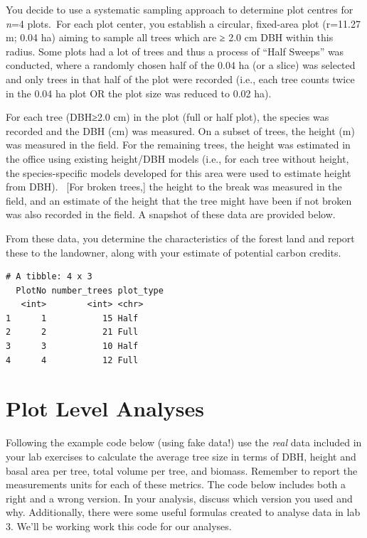 \documentclass[
  letterpaper,
]{book}
\begin{document}

You decide to use a systematic sampling approach to determine plot
centres for \emph{n}=4 plots.~For each plot center, you establish a
circular, fixed-area plot (r=11.27 m; 0.04 ha) aiming to sample all
trees which are ≥ 2.0 cm DBH within this radius. Some plots had a lot of
trees and thus a process of ``Half Sweeps'' was conducted, where a
randomly chosen half of the 0.04 ha (or a slice) was selected and only
trees in that half of the plot were recorded (i.e., each tree counts
twice in the 0.04 ha plot OR the plot size was reduced to 0.02 ha).

For each tree (DBH≥2.0 cm) in the plot (full or half plot), the species
was recorded and the DBH (cm) was measured. On a subset of trees, the
height (m) was measured in the field. For the remaining trees, the
height was estimated in the office using existing height/DBH models
(i.e., for each tree without height, the species-specific models
developed for this area were used to estimate height from DBH). ~{[}For
broken trees,{]} the height to the break was measured in the field, and
an estimate of the height that the tree might have been if not broken
was also recorded in the field. A snapshot of these data are provided
below.

From these data, you determine the characteristics of the forest land
and report these to the landowner, along with your estimate of potential
carbon credits.

\begin{verbatim}
# A tibble: 4 x 3
  PlotNo number_trees plot_type
   <int>        <int> <chr>    
1      1           15 Half     
2      2           21 Full     
3      3           10 Half     
4      4           12 Full     
\end{verbatim}

\hypertarget{plot-level-analyses}{%
\section*{Plot Level Analyses}\label{plot-level-analyses}}


Following the example code below (using fake data!) use the \emph{real}
data included in your lab exercises to calculate the average tree size
in terms of DBH, height and basal area per tree, total volume per tree,
and biomass. Remember to report the measurements units for each of these
metrics. The code below includes both a right and a wrong version. In
your analysis, discuss which version you used and why. Additionally,
there were some useful formulas created to analyse data in lab 3. We'll
be working work this code for our analyses.
\end{document}
